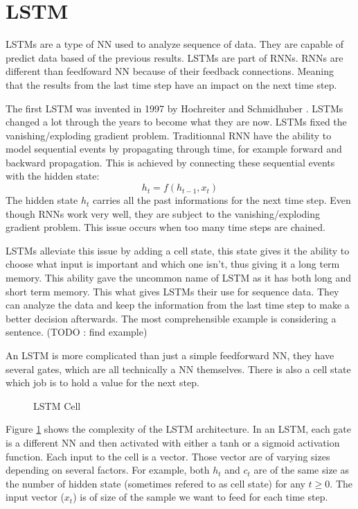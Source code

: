 \section{LSTM}\label{sec:lstm}
\acp{LSTM} are a type of \ac{NN} used to analyze sequence of data. They are capable of predict data based of the previous results. \acp{LSTM} are part of \acp{RNN}. \acp{RNN} are different than feedfoward \acl{NN} because of their feedback connections. Meaning that the results from the last time step have an impact on the next time step.

The first \ac{LSTM} was invented in 1997 by Hochreiter and Schmidhuber \cite{firstLSTM}. \acp{LSTM} changed a lot through the years to become what they are now.
\acp{LSTM} fixed the vanishing/exploding gradient problem. Traditionnal \ac{RNN} have the ability to model sequential events by propagating through time, for example forward and backward propagation. This is achieved by connecting these sequential events with the hidden state:
$$h_t=f(h_{t-1},x_t)$$
The hidden state $h_t$ carries all the past informations for the next time step.
Even though \acp{RNN} work very well, they are subject to the vanishing/exploding gradient problem. This issue occurs when too many time steps are chained.

\acp{LSTM} alleviate this issue by adding a cell state, this state gives it the ability to choose what input is important and which one isn't, thus giving it a long term memory. This ability gave the uncommon name of \acl{LSTM} as it has both long and short term memory. This what gives \acp{LSTM} their use for sequence data. They can analyze the data and keep the information from the last time step to make a better decision afterwards. The most comprehensible example is considering a sentence. (TODO : find example)

An \ac{LSTM} is more complicated than just a simple feedforward \acl{NN}, they have several gates, which are all technically a \ac{NN} themselves. There is also a cell state which job is to hold a value for the next step.

\begin{figure}[H]
  \centering
  
  \caption{LSTM Cell}
  \label{fig:lstmCell}
\end{figure}

Figure \ref{fig:lstmCell} shows the complexity of the \ac{LSTM} architecture. In an \ac{LSTM}, each gate is a different \ac{NN} and then activated with either a tanh or a sigmoid activation function. Each input to the cell is a vector.
Those vector are of varying sizes depending on several factors. For example, both $h_t$ and $c_t$ are of the same size as the number of hidden state (sometimes refered to as cell state) for any $t\geq 0$.
The input vector ($x_t$) is of size of the sample we want to feed for each time step.

